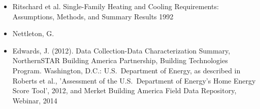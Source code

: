 \begin{itemize}
\item Ritschard et al. Single-Family Heating and Cooling Requirements: Assumptions, Methods, and Summary Results 1992
\item Nettleton, G.
\item Edwards, J. (2012). Data Collection-Data Characterization Summary, NorthernSTAR Building America Partnership, Building Technologies Program. Washington, D.C.: U.S.~Department of Energy, as described in Roberts et al., 'Assessment of the U.S.~Department of Energy's Home Energy Score Tool', 2012, and Merket Building America Field Data Repository, Webinar, 2014
\end{itemize}
